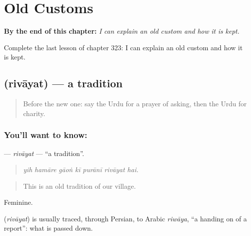 
\chapter{Old Customs}
\label{ch:ur-old-customs}

\begin{chapteropening}
\textbf{By the end of this chapter:} \emph{I can explain an old custom and how it is kept.}

Complete the last lesson of chapter 323: I can explain an old custom and how it is kept.
\end{chapteropening}

\section[\texorpdfstring{\ur{روایت} (rivāyat)}{روایت (rivāyat)}]{ (rivāyat) — a tradition}

\label{lesson:UR-C323-rivayat}



\begin{quote}
Before the new one: say the Urdu for a prayer of asking, then the Urdu for charity.
\end{quote}

\subsection*{You'll want to know: }
\textbf{} — \emph{rivāyat} — \textquotedblleft{}a tradition\textquotedblright{}.

\begin{quote}
      
\end{quote}

\begin{quote}
\emph{yih hamāre gāoṅ kī purānī rivāyat hai.}
\end{quote}

\begin{quote}
This is an old tradition of our village.
\end{quote}

Feminine.

\begin{cousinweb}
\textbf{} (\emph{rivāyat}) is usually traced, through Persian, to Arabic \emph{riwāya}, \textquotedblleft{}a handing on of a report\textquotedblright{}: what is passed down.
\end{cousinweb}

